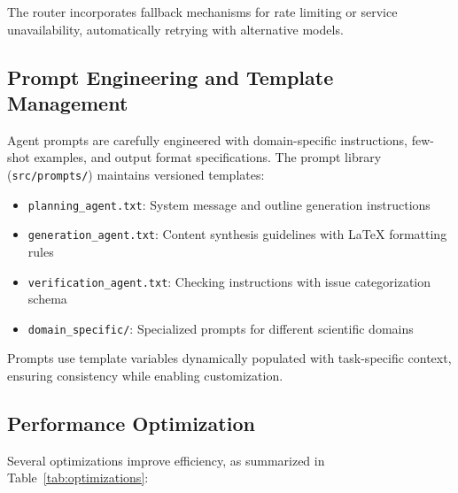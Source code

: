 \documentclass{ieeeaccess}
\begin{document}
The router incorporates fallback mechanisms for rate limiting or service unavailability, automatically retrying with alternative models.

\subsection{Prompt Engineering and Template Management}

Agent prompts are carefully engineered with domain-specific instructions, few-shot examples, and output format specifications. The prompt library (\texttt{src/prompts/}) maintains versioned templates:

\begin{itemize}
\item \texttt{planning\_agent.txt}: System message and outline generation instructions
\item \texttt{generation\_agent.txt}: Content synthesis guidelines with LaTeX formatting rules
\item \texttt{verification\_agent.txt}: Checking instructions with issue categorization schema
\item \texttt{domain\_specific/}: Specialized prompts for different scientific domains
\end{itemize}

Prompts use template variables dynamically populated with task-specific context, ensuring consistency while enabling customization.

\subsection{Performance Optimization}

Several optimizations improve efficiency, as summarized in Table~\ref{tab:optimizations}:
\end{document}
